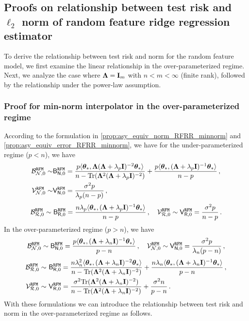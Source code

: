 \subsection{Proofs on relationship between test risk and \texorpdfstring{$\ell_2$}{L2} norm of random feature ridge regression estimator}
\label{app:relationship_rf}

To derive the relationship between test risk and norm for the random feature model, we first examine the linear relationship in the over-parameterized regime. Next, we analyze the case where \({\boldsymbol \Lambda} = {\mathbf I}_m\) with \(n < m < \infty\) (finite rank), followed by the relationship under the power-law assumption.



\subsubsection{Proof for min-norm interpolator in the over-parameterized regime}
According to the formulation in \cref{prop:asy_equiv_norm_RFRR_minnorm} and \cref{prop:asy_equiv_error_RFRR_minnorm}, we have for the under-parameterized regime ($p<n$), we have
\[
\begin{aligned}
    \mathcal{B}^{\tt RFM}_{\mathcal{N},0} \sim& \mathsf B^{\tt RFM}_{\mathsf N,0} = \frac{p\langle{\boldsymbol \theta}_*, {\boldsymbol \Lambda} ({\boldsymbol \Lambda} +\lambda_p{\mathbf I})^{-2} {\boldsymbol \theta}_*\rangle}{n - {\rm Tr}({\boldsymbol \Lambda}^2({\boldsymbol \Lambda}+\lambda_p{\mathbf I})^{-2})} + \frac{p\langle{\boldsymbol \theta}_*, ({\boldsymbol \Lambda} +\lambda_p{\mathbf I})^{-1} {\boldsymbol \theta}_*\rangle}{n-p}\,,\\
    \mathcal{V}^{\tt RFM}_{\mathcal{N},0} \sim& \mathsf V^{\tt RFM}_{\mathsf N,0} = \frac{\sigma^2p}{\lambda_p(n-p)}\,,
\end{aligned}
\]
\[
\begin{aligned}
    \mathcal{B}^{\tt RFM}_{\mathcal{R},0} \sim \mathsf B^{\tt RFM}_{\mathsf R,0} = \frac{n\lambda_p \langle{\boldsymbol \theta}_*, ({\boldsymbol \Lambda} +\lambda_p{\mathbf I})^{-1} {\boldsymbol \theta}_*\rangle}{n-p}\,,\quad \mathcal{V}^{\tt RFM}_{\mathcal{R},0} \sim \mathsf V^{\tt RFM}_{\mathsf R,0} = \frac{\sigma^2p}{n-p}\,.
\end{aligned}
\]
In the over-parameterized regime ($p>n$), we have
\[
\begin{aligned}
    \mathcal{B}^{\tt RFM}_{\mathcal{N},0} \sim \mathsf B^{\tt RFM}_{\mathsf N,0} = \frac{p\langle{\boldsymbol \theta}_*, ( {\boldsymbol \Lambda} + \lambda_n{\mathbf I})^{-1} {\boldsymbol \theta}_*\rangle}{p-n}\,,\quad
    \mathcal{V}^{\tt RFM}_{\mathcal{N},0} \sim \mathsf V^{\tt RFM}_{\mathsf N,0} = \frac{\sigma^2p}{\lambda_n(p-n)}\,,
\end{aligned}
\]
\[
\begin{aligned}
    \mathcal{B}^{\tt RFM}_{\mathcal{R},0} \sim&~ \mathsf B^{\tt RFM}_{\mathsf R,0} = \frac{n\lambda_n^2 \langle{\boldsymbol \theta}_*, ( {\boldsymbol \Lambda} + \lambda_n {\mathbf I})^{-2} {\boldsymbol \theta}_*\rangle}{ n - {\rm Tr}({\boldsymbol \Lambda}^2({\boldsymbol \Lambda}+\lambda_n{\mathbf I})^{-2})} + \frac{n\lambda_n \langle{\boldsymbol \theta}_*, ( {\boldsymbol \Lambda} + \lambda_n{\mathbf I})^{-1} {\boldsymbol \theta}_*\rangle}{p-n}\,,\\
    \mathcal{V}^{\tt RFM}_{\mathcal{R},0} \sim&~  \mathsf V^{\tt RFM}_{\mathsf R,0} = \frac{\sigma^2{\rm Tr}({\boldsymbol \Lambda}^2({\boldsymbol \Lambda}+\lambda_n{\mathbf I})^{-2})}{n - {\rm Tr}({\boldsymbol \Lambda}^2({\boldsymbol \Lambda}+\lambda_n{\mathbf I})^{-2})} + \frac{\sigma^2n}{p-n}\,.
\end{aligned}
\]
With these formulations we can introduce the relationship between test risk and norm in the over-parameterized regime as follows. 

